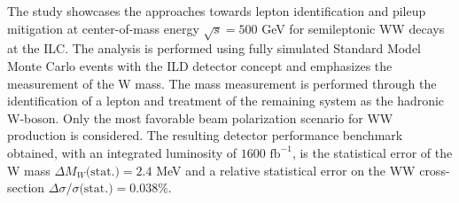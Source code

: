 %

%

 The study showcases the approaches towards lepton identification and pileup mitigation at center-of-mass energy $\sqrt{s} = 500$ GeV for semileptonic WW decays at the ILC. The analysis is performed using fully simulated Standard Model Monte Carlo events with the ILD detector concept and emphasizes the measurement of the W mass. The mass measurement is performed through the identification of a lepton and treatment of the remaining system as the hadronic W-boson. Only the most favorable beam polarization scenario for WW production is considered. The resulting detector performance benchmark obtained, with an integrated luminosity of $1600 \, \, \text{fb}^{-1}$, is the statistical error of the W mass $\Delta M_W\text{(stat.)} =  2.4 $ MeV and a relative statistical error on the WW cross-section $\Delta \sigma / \sigma \text{(stat.)} = 0.038\% $. 


